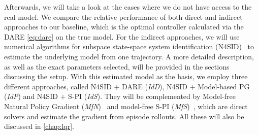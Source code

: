 Afterwards, we will take a look at the cases where we do not have access to the real model. We compare
the relative performance of both direct and indirect approaches to our baseline, which is
the optimal controller calculated via the DARE \eqref{eq:dare} on the true model. For the indirect
approaches, we will use numerical algorithms for subspace state-space system identification
(N4SID)~\cite{VanOverschee1994N4SID} to estimate the underlying model from one
trajectory. A more detailed description, as well as the exact parameters selected,
will be provided in the sections discussing the setup. With this estimated model as
the basis, we employ three different approaches, called N4SID + DARE (\emph{IdD}), N4SID + Model-based PG (\emph{IdP}) and N4SID + S-PI (\emph{IdS}).
They will be complemented by Model-free Natural Policy Gradient (\emph{MfN})~\cite{Fazel2018Global} and model-free S-PI (\emph{MfS})~\cite{Park2020Structured},
which are direct solvers and estimate the gradient from episode rollouts.
All these will also be discussed in \cref{chap:lqr}.

